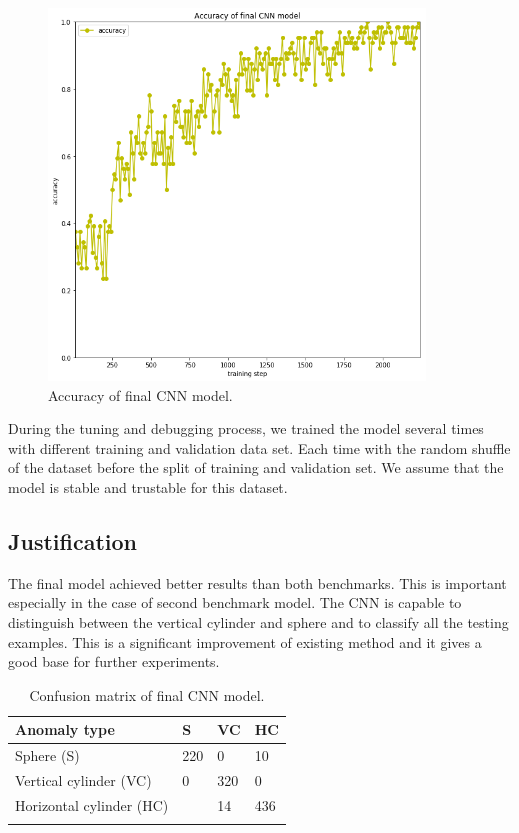 \documentclass{article}
\begin{document}
\begin{figure}[!htp]
\centerline{\includegraphics[width=10cm]{img/final_model_accuracy.png}}
\renewcommand{\figurename}{Figure}
\caption[Accuracy of final CNN model.]{Accuracy of final CNN model.}
\label{fig:InitialModelAccuracy}
\end{figure}


During the tuning and debugging process, we trained the model several
times with different training and validation data set. Each time with
the random shuffle of the dataset before the split of training and
validation set. We assume that the model is stable and trustable for
this dataset.

\subsection{Justification}\label{justification}

The final model achieved better results than both benchmarks. This is
important especially in the case of second benchmark model. The CNN is
capable to distinguish between the vertical cylinder and sphere and to
classify all the testing examples. This is a significant improvement of
existing method and it gives a good base for further experiments.

\begin{longtable}[c]{@{}llll@{}}
\toprule
Anomaly type & S & VC & HC\tabularnewline
\midrule
\endhead
Sphere (S) & 220 & 0 & 10\tabularnewline
Vertical cylinder (VC) & 0 & 320 & 0\tabularnewline
Horizontal cylinder (HC) & & 14 & 436\tabularnewline
\bottomrule
\caption[Confusion matrix of final CNN model]{Confusion matrix of final CNN model.}
\label{tab:ConfusionMatrixBenchmark2}
\end{longtable}
\end{document}
